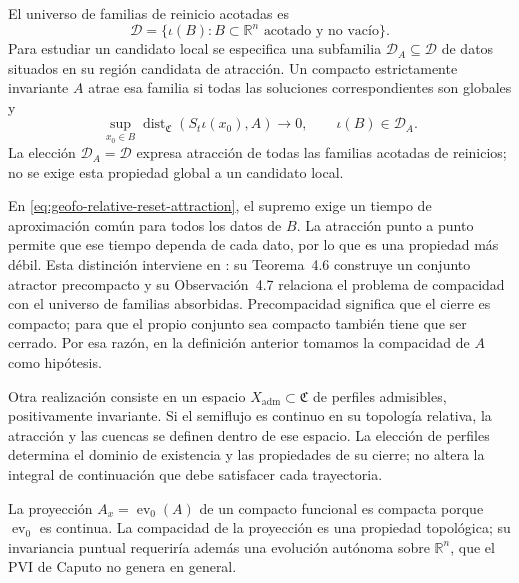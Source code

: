 \begin{definition}
\label{def:geofo-reset-family-attraction}
El universo de familias de reinicio acotadas es
\begin{equation}
 \mathcal D=\{\iota(B):B\subset\mathbb R^n\text{ acotado y no vacío}\}.
 \label{eq:geofo-reset-universe}
\end{equation}
Para estudiar un candidato local se especifica una subfamilia
\(\mathcal D_A\subseteq\mathcal D\) de datos situados en su región
candidata de atracción. Un compacto estrictamente invariante \(A\)
atrae esa familia si todas las soluciones correspondientes son globales y
\begin{equation}
 \sup_{x_0\in B}
 \operatorname{dist}_{\mathfrak C}(S_t\iota(x_0),A)\longrightarrow0,
 \qquad \iota(B)\in\mathcal D_A.
 \label{eq:geofo-relative-reset-attraction}
\end{equation}
La elección \(\mathcal D_A=\mathcal D\) expresa atracción de todas las
familias acotadas de reinicios; no se exige esta propiedad global a un
candidato local.
\end{definition}

En \cref{eq:geofo-relative-reset-attraction}, el supremo exige un tiempo
de aproximación común para todos los datos de \(B\). La atracción punto a
punto permite que ese tiempo dependa de cada dato, por lo que es una
propiedad más débil. Esta distinción interviene en
\cite{CuiKloedenXin2026CaputoDynamics}: su Teorema~4.6 construye un conjunto
atractor precompacto y su Observación~4.7 relaciona el problema de compacidad
con el universo de familias absorbidas. Precompacidad significa que el
cierre es compacto; para que el propio conjunto sea compacto también tiene
que ser cerrado. Por esa razón, en la definición anterior tomamos la
compacidad de \(A\) como hipótesis.

Otra realización consiste en un espacio
\(X_{\mathrm{adm}}\subset\mathfrak C\) de perfiles admisibles,
positivamente invariante. Si el semiflujo es continuo en su topología
relativa, la atracción y las cuencas se definen dentro de ese espacio.
La elección de perfiles determina el dominio de existencia y las
propiedades de su cierre; no altera la integral de continuación que debe
satisfacer cada trayectoria.

La proyección \(A_x=\operatorname{ev}_0(A)\) de un compacto funcional es
compacta porque \(\operatorname{ev}_0\) es continua. La compacidad de la proyección es una propiedad topológica; su invariancia
puntual requeriría además una evolución autónoma sobre \(\mathbb R^n\),
que el PVI de Caputo no genera en general.


